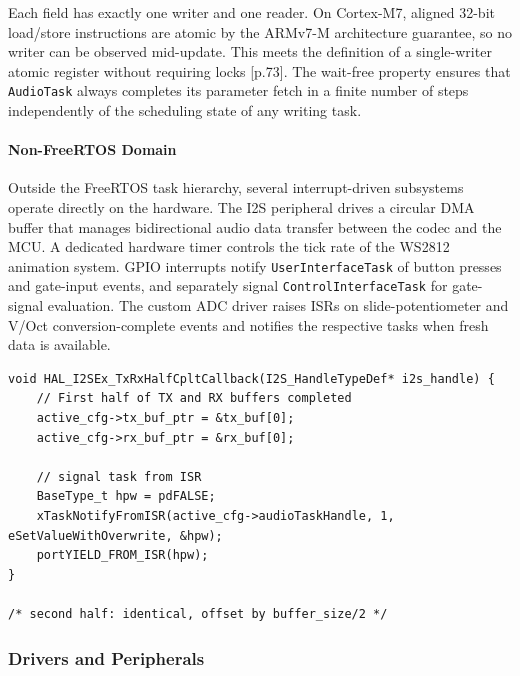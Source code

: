 Each field has exactly one writer and one reader. On Cortex-M7, aligned 32-bit load/store instructions are atomic by the ARMv7-M architecture guarantee, so no writer can be observed mid-update. This meets the definition of a single-writer atomic register without requiring locks [p.73]\cite{herlihyArtMultiprocessorProgramming2009}. 
The wait-free property ensures that \texttt{AudioTask} always completes its parameter fetch in a finite number of steps independently of the scheduling state of any writing task.

\paragraph{Non-FreeRTOS Domain}
Outside the FreeRTOS task hierarchy, several interrupt-driven subsystems operate directly on the hardware. 
The I2S peripheral drives a circular DMA buffer that manages bidirectional audio data transfer between the codec and the MCU. 
A dedicated hardware timer controls the tick rate of the WS2812 animation system. 
GPIO interrupts notify \texttt{UserInterfaceTask} of button presses and gate-input events, and separately signal \texttt{ControlInterfaceTask} for gate-signal evaluation. 
The custom ADC driver raises ISRs on slide-potentiometer and \mbox{V/Oct} conversion-complete events and notifies the respective tasks when fresh data is available.

\begin{listing}[h]
\begin{verbatim}
void HAL_I2SEx_TxRxHalfCpltCallback(I2S_HandleTypeDef* i2s_handle) {
    // First half of TX and RX buffers completed
    active_cfg->tx_buf_ptr = &tx_buf[0];
    active_cfg->rx_buf_ptr = &rx_buf[0];
    
    // signal task from ISR
    BaseType_t hpw = pdFALSE;
    xTaskNotifyFromISR(active_cfg->audioTaskHandle, 1, eSetValueWithOverwrite, &hpw);
    portYIELD_FROM_ISR(hpw);
}

/* second half: identical, offset by buffer_size/2 */
\end{verbatim}
\caption{Overloaded HAL I2S DMA Complete and HalfComplete callbacks that handle double buffering of the audio engine in non-RTOS domain}
\end{listing}

\subsubsection{Drivers and Peripherals}

